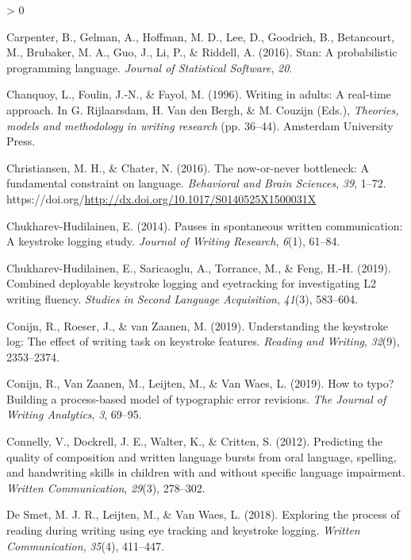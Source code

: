 \documentclass[
  english,
  man,mask,floatsintext]{apa7}
\newlength{\cslhangindent}
\newenvironment{CSLReferences}[2] %
 {%
  \setlength{\parindent}{0pt}
  \ifodd #1 \everypar{\setlength{\hangindent}{\cslhangindent}}\ignorespaces\fi
  \ifnum #2 > 0
  \setlength{\parskip}{#2\baselineskip}
  \fi
 }%
 {}
\begin{document}
\begin{CSLReferences}{1}{0}
\leavevmode\hypertarget{ref-carpenter2016stan}{}%
Carpenter, B., Gelman, A., Hoffman, M. D., Lee, D., Goodrich, B., Betancourt, M., Brubaker, M. A., Guo, J., Li, P., \& Riddell, A. (2016). Stan: A probabilistic programming language. \emph{Journal of Statistical Software}, \emph{20}.

\leavevmode\hypertarget{ref-chanquoy1996writing}{}%
Chanquoy, L., Foulin, J.-N., \& Fayol, M. (1996). Writing in adults: {A} real-time approach. In G. Rijlaarsdam, H. Van den Bergh, \& M. Couzijn (Eds.), \emph{Theories, models and methodology in writing research} (pp. 36--44). Amsterdam University Press.

\leavevmode\hypertarget{ref-christiansen2016now}{}%
Christiansen, M. H., \& Chater, N. (2016). The now-or-never bottleneck: {A} fundamental constraint on language. \emph{Behavioral and Brain Sciences}, \emph{39}, 1--72. https://doi.org/\url{http://dx.doi.org/10.1017/S0140525X1500031X}

\leavevmode\hypertarget{ref-chukharev2014pauses}{}%
Chukharev-Hudilainen, E. (2014). Pauses in spontaneous written communication: {A} keystroke logging study. \emph{Journal of Writing Research}, \emph{6}(1), 61--84.

\leavevmode\hypertarget{ref-chukharev2019combined}{}%
Chukharev-Hudilainen, E., Saricaoglu, A., Torrance, M., \& Feng, H.-H. (2019). Combined deployable keystroke logging and eyetracking for investigating {L2} writing fluency. \emph{Studies in Second Language Acquisition}, \emph{41}(3), 583--604.

\leavevmode\hypertarget{ref-conijn2019understanding}{}%
Conijn, R., Roeser, J., \& van Zaanen, M. (2019). Understanding the keystroke log: The effect of writing task on keystroke features. \emph{Reading and Writing}, \emph{32}(9), 2353--2374.

\leavevmode\hypertarget{ref-conijn2019typo}{}%
Conijn, R., Van Zaanen, M., Leijten, M., \& Van Waes, L. (2019). How to typo? Building a process-based model of typographic error revisions. \emph{The Journal of Writing Analytics}, \emph{3}, 69--95.

\leavevmode\hypertarget{ref-connelly2012predicting}{}%
Connelly, V., Dockrell, J. E., Walter, K., \& Critten, S. (2012). Predicting the quality of composition and written language bursts from oral language, spelling, and handwriting skills in children with and without specific language impairment. \emph{Written Communication}, \emph{29}(3), 278--302.

\leavevmode\hypertarget{ref-de2018exploring}{}%
De Smet, M. J. R., Leijten, M., \& Van Waes, L. (2018). Exploring the process of reading during writing using eye tracking and keystroke logging. \emph{Written Communication}, \emph{35}(4), 411--447.


\end{CSLReferences}
\end{document}
